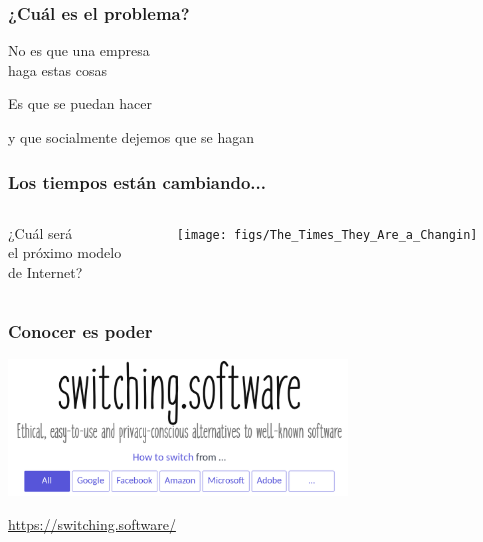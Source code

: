 \documentclass[17pt,aspectratio=169,hyperref=pdfusetitle]{beamer}
\begin{document}

\begin{frame}
\frametitle{¿Cuál es el problema?}

{\large
\begin{center}
No es que una empresa \\
haga estas cosas
\pause
\vspace{1cm}

Es que se puedan hacer
\pause
\vspace{1cm}

y que socialmente dejemos que se hagan
\end{center}
}
\end{frame}

\begin{frame}[fragile]
  \frametitle{Los tiempos están cambiando...}

\begin{columns}
  \begin{column}{0.7\textwidth}
    {\Large ¿Cuál será \\
    el próximo modelo \\
    de Internet? \\ }
  \end{column}
  \begin{column}{0.3\textwidth}  %
    \begin{center}
      \texttt{[image: figs/The\_Times\_They\_Are\_a\_Changin]}
    \end{center}
  \end{column}
\end{columns}
  
\end{frame}


\begin{frame}[fragile]
  \frametitle{Conocer es poder}

  \begin{center}
  \includegraphics[width=9cm]{figs/switching-software}
  \end{center}

  \begin{flushright}
      \url{https://switching.software/} \\
  \end{flushright}

\end{frame}
\end{document}

